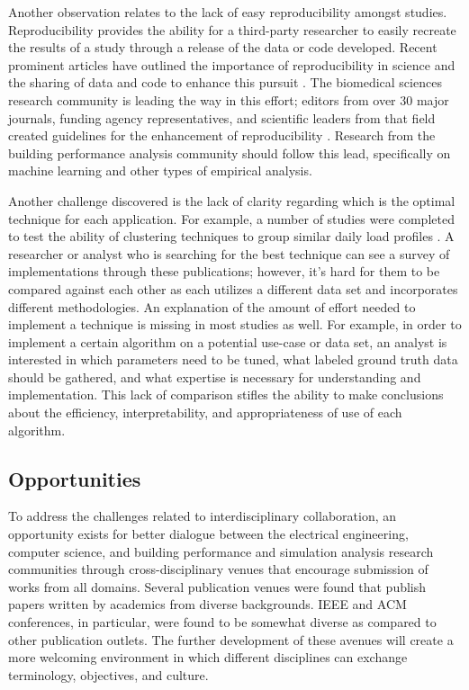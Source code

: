 \documentclass[preprint,12pt,3p]{elsarticle}
\begin{document}
Another observation relates to the lack of easy reproducibility amongst studies. Reproducibility provides the ability for a third-party researcher to easily recreate the results of a study through a release of the data or code developed. Recent prominent articles have outlined the importance of reproducibility in science \cite{_journals_2014} and the sharing of data and code to enhance this pursuit \cite{_code_2014}. The biomedical sciences research community is leading the way in this effort; editors from over 30 major journals, funding agency representatives, and scientific leaders from that field created guidelines for the enhancement of reproducibility \cite{_journals_2014}. Research from the building performance analysis community should follow this lead, specifically on machine learning and other types of empirical analysis.

Another challenge discovered is the lack of clarity regarding which is the optimal technique for each application. For example, a number of studies were completed to test the ability of clustering techniques to group similar daily load profiles \cite{chicco_support_2009,de_silva_data_2011,green_divide_2014,gullo_low-voltage_2009,lavin_clustering_2014,ramos_typical_2012,shahzadeh_improving_2015}. A researcher or analyst who is searching for the best technique can see a survey of implementations through these publications; however, it's hard for them to be compared against each other as each utilizes a different data set and incorporates different methodologies. An explanation of the amount of effort needed to implement a technique is missing in most studies as well. For example, in order to implement a certain algorithm on a potential use-case or data set, an analyst is interested in which parameters need to be tuned, what labeled ground truth data should be gathered, and what expertise is necessary for understanding and implementation. This lack of comparison stifles the ability to make conclusions about the efficiency, interpretability, and appropriateness of use of each algorithm. 

\subsection{Opportunities}
To address the challenges related to interdisciplinary collaboration, an opportunity exists for better dialogue between the electrical engineering, computer science, and building performance and simulation analysis research communities through cross-disciplinary venues that encourage submission of works from all domains. Several publication venues were found that publish papers written by academics from diverse backgrounds. IEEE and ACM conferences, in particular, were found to be somewhat diverse as compared to other publication outlets. The further development of these avenues will create a more welcoming environment in which different disciplines can exchange terminology, objectives, and culture.
\end{document}
